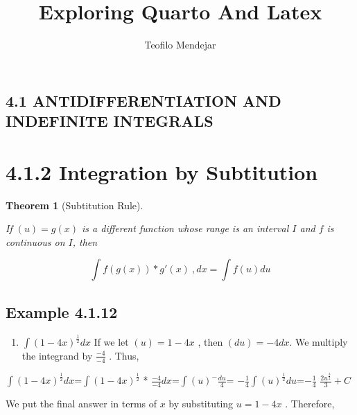 \documentclass[
  letterpaper,
  DIV=11,
  numbers=noendperiod]{scrartcl}
\title{Exploring Quarto And Latex}
\author{Teofilo Mendejar}
\date{}
\providecommand{\tightlist}{%
  \setlength{\itemsep}{0pt}\setlength{\parskip}{0pt}}\usepackage{longtable,booktabs,array}
\theoremstyle{plain}
\newtheorem{theorem}{Theorem}[section]
\theoremstyle{remark}
\begin{document}
\maketitle
\ifdefined\Shaded\renewenvironment{Shaded}{\begin{tcolorbox}[borderline west={3pt}{0pt}{shadecolor}, interior hidden, sharp corners, breakable, boxrule=0pt, enhanced, frame hidden]}{\end{tcolorbox}}\fi

\hypertarget{antidifferentiation-and-indefinite-integrals}{%
\subsection{4.1 ANTIDIFFERENTIATION AND INDEFINITE
INTEGRALS}\label{antidifferentiation-and-indefinite-integrals}}

\hypertarget{integration-by-subtitution}{%
\section{4.1.2 Integration by
Subtitution}\label{integration-by-subtitution}}

\begin{theorem}[Subtitution
Rule]\protect\hypertarget{thm-sub_Rule}{}\label{thm-sub_Rule}

If \((u) = g(x)\) is a different function whose range is an interval
\(I\) and \(f\) is continuous on \(I\), then

\[\int f(g(x)) * g'(x)\ ,dx = \int f(u) du\]

\end{theorem}

\hypertarget{example-4.1.12}{%
\subsection{Example 4.1.12}\label{example-4.1.12}}

\begin{enumerate}
\def\labelenumi{\arabic{enumi}.}
\tightlist
\item
  \(\int(1-4x)^\frac{1}{2}dx\) If we let \((u)=1-4x\) , then
  \((du)=-4dx\). We multiply the integrand by \(\frac{-4}{-4}\) . Thus,
\end{enumerate}

\(\int(1-4x)^\frac{1}{2}dx\)=\(\int(1-4x)^\frac{1}{2}\) *
\(\frac{-4}{-4}dx\)=\(\int(u)^-\frac{du}{4}\)=
\(-\frac{1}{4}\)\(\int(u)^\frac{1}{2}du\)=\(-\frac{1}{4}\)
\(\frac{2u^\frac{3}{2}}{3}+C\)

We put the final answer in terms of \(x\) by substituting \(u=1-4x\) .
Therefore,
\end{document}
